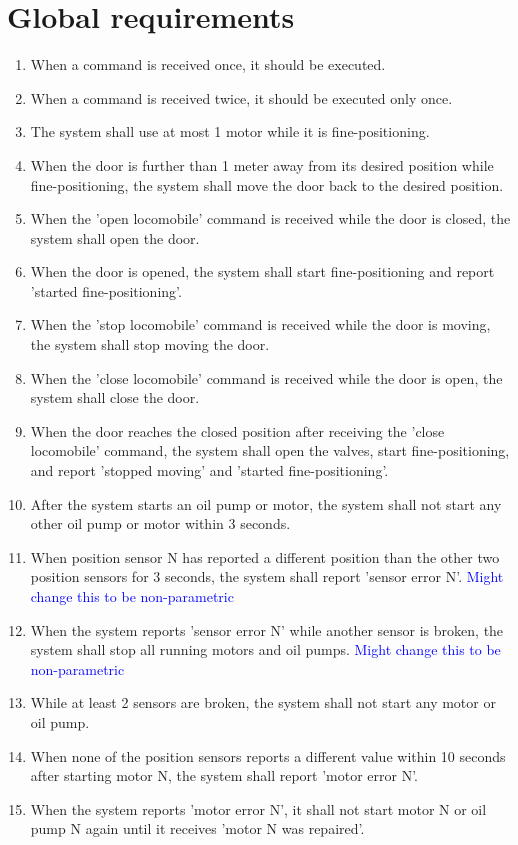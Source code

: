 \documentclass{article}
\begin{document}
\section{Global requirements}
\begin{enumerate}
    \item When a command is received once, it should be executed.
    \item When a command is received twice, it should be executed only once.

    \item The system shall use at most 1 motor while it is fine-positioning.
    \item When the door is further than 1 meter away from its desired position
    while fine-positioning, the system shall move the door back to the desired
    position.

    \item When the 'open locomobile' command is received while the door is closed,
    the system shall open the door.
    \item When the door is opened, the system shall start fine-positioning and
    report 'started fine-positioning'.

    \item When the 'stop locomobile' command is received while the door is moving,
    the system shall stop moving the door.

    \item When the 'close locomobile' command is received while the door is open,
    the system shall close the door.
    \item When the door reaches the closed position after receiving the 
    'close locomobile' command, the system shall open the valves, 
    start fine-positioning, and report 'stopped moving' and 'started fine-positioning'.


    \item After the system starts an oil pump or motor, the system shall not start
    any other oil pump or motor within 3 seconds.
    \item When position sensor N has reported a different position than the other two
        position sensors for 3 seconds, the system shall report 'sensor error N'. \textcolor{blue}{Might change this to be non-parametric}
    \item When the system reports 'sensor error N' while another sensor is broken, the
    system shall stop all running motors and oil pumps. \textcolor{blue}{Might change this to be non-parametric}
    \item While at least 2 sensors are broken, the system shall not start any motor or
    oil pump.

    \item When none of the position sensors reports a different value within 10 seconds 
    after starting motor N, the system shall report 'motor error N'.
    \item When the system reports 'motor error N', it shall not start motor N or oil pump
    N again until it receives 'motor N was repaired'.
\end{enumerate}
\end{document}
